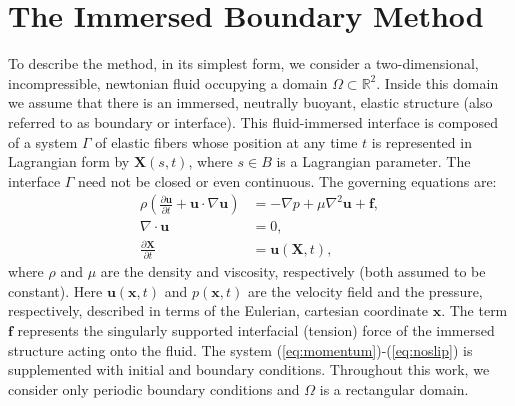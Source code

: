 \documentclass[preprint,12pt]{elsarticle}
\begin{document}
 \section{The Immersed Boundary Method}
 \label{Sec:IB}
To describe the method,  in its simplest form, we 
consider a two-dimensional, incompressible, newtonian fluid occupying a domain $\Omega \subset \mathbb{R}^2$. Inside this domain
we assume that there is an immersed, neutrally buoyant, elastic structure (also referred to as boundary or interface). This fluid-immersed interface is composed of a system  $\Gamma$ of elastic fibers whose position at any time $t$ is represented in Lagrangian form by $\mathbf{X}(s,t)$, where $s \in B$ is a Lagrangian parameter. The interface $\Gamma$
need not be closed or even continuous. The governing equations are:
\begin{align}
\rho \left(\frac{\partial \mathbf{u}}{\partial t} + \mathbf{u}\cdot\nabla\mathbf{u} \right) &= -\nabla p + \mu\nabla^2 \mathbf{u} + \mathbf{f}, \label{eq:momentum}\\ 
\nabla \cdot \mathbf{u} &= 0, \label{eq:incompressibility}\\
\frac{\partial \mathbf{X}}{\partial t}  &= \mathbf{u}(\mathbf{X},t), \label{eq:noslip}
\end{align}
where $\rho$ and $\mu$ are the density and viscosity, respectively (both assumed to be constant). Here $\mathbf{u}(\mathbf{x},t)$ and $p(\mathbf{x},t)$ are the velocity field and the pressure, respectively, described in terms of the Eulerian, cartesian coordinate $\mathbf{x}$. The term $\mathbf{f}$ represents the singularly supported interfacial (tension) force of the immersed structure acting onto the fluid. The system (\ref{eq:momentum})-(\ref{eq:noslip}) is supplemented with initial and boundary conditions. Throughout this work, we consider only periodic boundary conditions and $\Omega$ is a rectangular domain.
\end{document}
